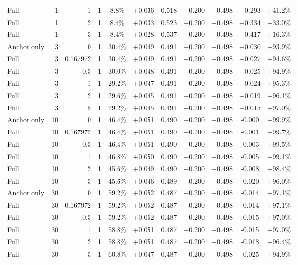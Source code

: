 \begin{table}[htbp]
\begin{tabular}{lrrrccccccc}
Full & 1 & 1 & 1 & 8.8\% & +0.036 & 0.518 & +0.200 & +0.498 & +0.293 & +41.2\% \\
Full & 1 & 2 & 1 & 8.4\% & +0.033 & 0.523 & +0.200 & +0.498 & +0.334 & +33.0\% \\
Full & 1 & 5 & 1 & 8.4\% & +0.028 & 0.537 & +0.200 & +0.498 & +0.417 & +16.3\% \\
Anchor only & 3 & 0 & 1 & 30.4\% & +0.049 & 0.491 & +0.200 & +0.498 & +0.030 & +93.9\% \\
Full & 3 & 0.167972 & 1 & 30.4\% & +0.049 & 0.491 & +0.200 & +0.498 & +0.027 & +94.6\% \\
Full & 3 & 0.5 & 1 & 30.0\% & +0.048 & 0.491 & +0.200 & +0.498 & +0.025 & +94.9\% \\
Full & 3 & 1 & 1 & 29.2\% & +0.047 & 0.491 & +0.200 & +0.498 & +0.024 & +95.3\% \\
Full & 3 & 2 & 1 & 29.6\% & +0.045 & 0.491 & +0.200 & +0.498 & +0.019 & +96.1\% \\
Full & 3 & 5 & 1 & 29.2\% & +0.045 & 0.491 & +0.200 & +0.498 & +0.015 & +97.0\% \\
Anchor only & 10 & 0 & 1 & 46.4\% & +0.051 & 0.490 & +0.200 & +0.498 & -0.000 & +99.9\% \\
Full & 10 & 0.167972 & 1 & 46.4\% & +0.051 & 0.490 & +0.200 & +0.498 & -0.001 & +99.7\% \\
Full & 10 & 0.5 & 1 & 46.4\% & +0.051 & 0.490 & +0.200 & +0.498 & -0.003 & +99.5\% \\
Full & 10 & 1 & 1 & 46.8\% & +0.050 & 0.490 & +0.200 & +0.498 & -0.005 & +99.1\% \\
Full & 10 & 2 & 1 & 45.6\% & +0.049 & 0.490 & +0.200 & +0.498 & -0.008 & +98.4\% \\
Full & 10 & 5 & 1 & 45.6\% & +0.046 & 0.489 & +0.200 & +0.498 & -0.020 & +96.0\% \\
Anchor only & 30 & 0 & 1 & 59.2\% & +0.052 & 0.487 & +0.200 & +0.498 & -0.014 & +97.1\% \\
Full & 30 & 0.167972 & 1 & 59.2\% & +0.052 & 0.487 & +0.200 & +0.498 & -0.014 & +97.1\% \\
Full & 30 & 0.5 & 1 & 59.2\% & +0.052 & 0.487 & +0.200 & +0.498 & -0.015 & +97.0\% \\
Full & 30 & 1 & 1 & 58.8\% & +0.051 & 0.487 & +0.200 & +0.498 & -0.015 & +97.0\% \\
Full & 30 & 2 & 1 & 58.8\% & +0.051 & 0.487 & +0.200 & +0.498 & -0.018 & +96.4\% \\
Full & 30 & 5 & 1 & 60.8\% & +0.047 & 0.487 & +0.200 & +0.498 & -0.025 & +94.9\% \\

\end{tabular}
\end{table}

